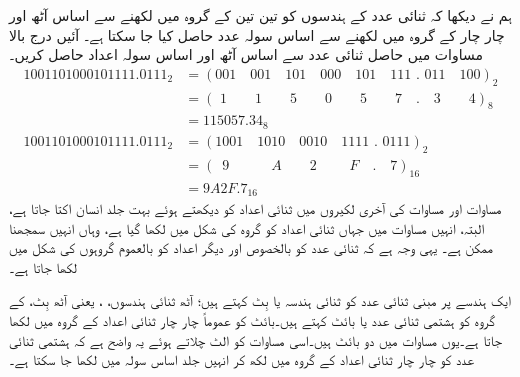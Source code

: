 ہم نے دیکھا کہ ثنائی عدد کے ہندسوں  کو تین تین کے گروہ میں لکھنے سے اساس آٹھ اور چار چار کے گروہ میں لکھنے سے اساس سولہ  عدد حاصل کیا جا سکتا ہے۔ آئیں   درج بالا مساوات میں حاصل ثنائی عدد سے اساس آٹھ اور اساس سولہ  اعداد حاصل کریں۔
 \begin{align*}
 1001101000101111.0111_2&=(001\quad 001\quad 101\quad 000\quad 101\quad 111\,\, . \,\,011\quad 100)_2\\
 &=(\,\,1\quad \quad 1\quad \quad 5\quad \quad 0 \quad \quad 5\quad \quad 7\quad .\quad  3\quad \quad 4)_8\\
 &=115057.34_8\\
  1001101000101111.0111_2&=(1001\quad 1010\quad 0010\quad 1111\,\, . \,\,0111)_2\\
 &=(\,\,\,9\quad \quad \quad A\quad \quad 2\quad \quad \,\,F \quad  . \quad  7)_{16}\\
 &=9A2F.7_{16}
 \end{align*}
	مساوات    اور  مساوات   کی آخری لکیروں میں ثنائی اعداد کو دیکھتے ہوئے بہت جلد انسان اکتا جاتا ہے،  البتہ،  انہیں مساوات میں جہاں ثنائی اعداد کو گروہ کی شکل میں لکھا گیا ہے،  وہاں انہیں سمجھنا ممکن ہے۔ یہی وجہ ہے کہ ثنائی عدد کو  بالخصوص اور دیگر اعداد کو  بالعموم گروہوں کی شکل میں لکھا جاتا ہے۔
	
ایک ہندسے پر مبنی ثنائی عدد کو ثنائی ہندسہ یا بِٹ  کہتے ہیں؛    آٹھ ثنائی ہندسوں، ، یعنی آٹھ بِٹ،  کے گروہ  کو   ہشتمی ثنائی عدد یا  بائٹ کہتے ہیں۔بائٹ کو  عموماً  چار چار  ثنائی اعداد کے گروہ میں لکھا جاتا ہے۔یوں مساوات    میں دو بائٹ ہیں۔اسی مساوات کو الٹ چلاتے ہوئے یہ واضح ہے کہ ہشتمی ثنائی عدد کو چار چار ثنائی اعداد کے  گروہ میں لکھ کر انہیں جلد اساس سولہ میں لکھا جا سکتا ہے۔
